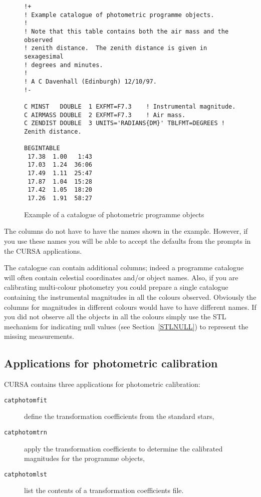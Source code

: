 \documentclass[twoside,11pt]{article}
\renewcommand{\_}{\texttt{\symbol{95}}}
\begin{document}
\begin{figure}[htbp]

\begin{verbatim}
!+
! Example catalogue of photometric programme objects.
!
! Note that this table contains both the air mass and the observed
! zenith distance.  The zenith distance is given in sexagesimal
! degrees and minutes.
!
! A C Davenhall (Edinburgh) 12/10/97.
!-

C MINST   DOUBLE  1 EXFMT=F7.3    ! Instrumental magnitude.
C AIRMASS DOUBLE  2 EXFMT=F7.3    ! Air mass.
C ZENDIST DOUBLE  3 UNITS='RADIANS{DM}' TBLFMT=DEGREES ! Zenith distance.

BEGINTABLE
 17.38  1.00   1:43
 17.03  1.24  36:06
 17.49  1.11  25:47
 17.87  1.04  15:28
 17.42  1.05  18:20
 17.26  1.91  58:27
\end{verbatim}

\caption{Example of a catalogue of photometric programme objects
\label{PHOTOPRGCAT} }

\end{figure}

The columns do not have to have the names shown in the example.
However, if you use these names you will be able to accept the defaults
from the prompts in the CURSA applications.

The catalogue can contain additional columns; indeed a programme catalogue
will often contain celestial coordinates and/or object names.  Also, if
you are calibrating multi-colour photometry you could prepare a single
catalogue containing the instrumental magnitudes in all the colours
observed.  Obviously the columns for magnitudes in different colours
would have to have different names.  If you did not observe all the
objects in all the colours simply use the STL mechanism for indicating
null values (see Section~\ref{STLNULL}) to represent the missing
measurements.

\subsection{Applications for photometric calibration}

CURSA contains three applications for photometric calibration:

\begin{description}

  \item[{\tt catphotomfit}] define the transformation coefficients from
   the standard stars,

  \item[{\tt catphotomtrn}] apply the transformation coefficients to
   determine the calibrated magnitudes for the programme objects,

  \item[{\tt catphotomlst}] list the contents of a transformation
   coefficients file.

\end{description}
\end{document}
